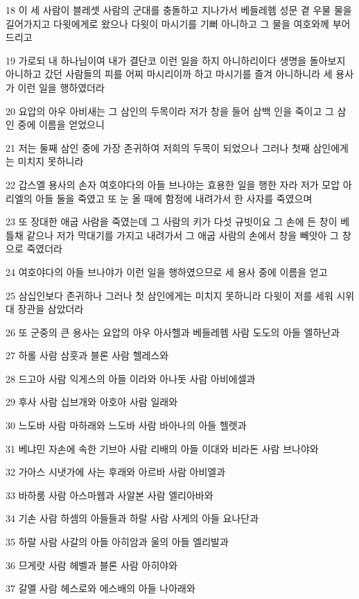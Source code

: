 \par 18 이 세 사람이 블레셋 사람의 군대를 충돌하고 지나가서 베들레헴 성문 곁 우물 물을 길어가지고 다윗에게로 왔으나 다윗이 마시기를 기뻐 아니하고 그 물을 여호와께 부어드리고
\par 19 가로되 내 하나님이여 내가 결단코 이런 일을 하지 아니하리이다 생명을 돌아보지 아니하고 갔던 사람들의 피를 어찌 마시리이까 하고 마시기를 즐겨 아니하니라 세 용사가 이런 일을 행하였더라
\par 20 요압의 아우 아비새는 그 삼인의 두목이라 저가 창을 들어 삼백 인을 죽이고 그 삼인 중에 이름을 얻었으니
\par 21 저는 둘째 삼인 중에 가장 존귀하여 저희의 두목이 되었으나 그러나 첫째 삼인에게는 미치지 못하니라
\par 22 갑스엘 용사의 손자 여호야다의 아들 브나야는 효용한 일을 행한 자라 저가 모압 아리엘의 아들 둘을 죽였고 또 눈 올 때에 함정에 내려가서 한 사자를 죽였으며
\par 23 또 장대한 애굽 사람을 죽였는데 그 사람의 키가 다섯 규빗이요 그 손에 든 창이 베틀채 같으나 저가 막대기를 가지고 내려가서 그 애굽 사람의 손에서 창을 빼앗아 그 창으로 죽였더라
\par 24 여호야다의 아들 브나야가 이런 일을 행하였으므로 세 용사 중에 이름을 얻고
\par 25 삼십인보다 존귀하나 그러나 첫 삼인에게는 미치지 못하니라 다윗이 저를 세워 시위대 장관을 삼았더라
\par 26 또 군중의 큰 용사는 요압의 아우 아사헬과 베들레헴 사람 도도의 아들 엘하난과
\par 27 하롤 사람 삼훗과 블론 사람 헬레스와
\par 28 드고아 사람 익게스의 아들 이라와 아나돗 사람 아비에셀과
\par 29 후사 사람 십브개와 아호아 사람 일래와
\par 30 느도바 사람 마하래와 느도바 사람 바아나의 아들 헬렛과
\par 31 베냐민 자손에 속한 기브아 사람 리배의 아들 이대와 비라돈 사람 브나야와
\par 32 가아스 시냇가에 사는 후래와 아르바 사람 아비엘과
\par 33 바하룸 사람 아스마웹과 사알본 사람 엘리아바와
\par 34 기손 사람 하셈의 아들들과 하랄 사람 사게의 아들 요나단과
\par 35 하랄 사람 사갈의 아들 아히암과 울의 아들 엘리발과
\par 36 므게랏 사람 헤벨과 블론 사람 아히야와
\par 37 갈멜 사람 헤스로와 에스배의 아들 나아래와
